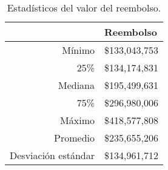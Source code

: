 \begin{table}[!htbp]
\centering
\caption{Estadísticos del valor del reembolso.} 
\label{tab:reembolso}
\begin{tabular}{rl}
  \hline
 & Reembolso \\ 
  \hline
Mínimo & \$133,043,753 \\ 
  25\% & \$134,174,831 \\ 
  Mediana & \$195,499,631 \\ 
  75\% & \$296,980,006 \\ 
  Máximo & \$418,577,808 \\ 
  Promedio & \$235,655,206 \\ 
  Desviación estándar & \$134,961,712 \\ 
   \hline
\end{tabular}
\end{table}
